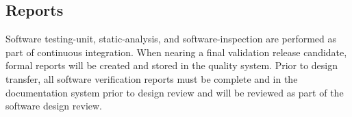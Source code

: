 \subsection{Reports}
Software \gls{testing-unit}, \gls{static-analysis}, and \gls{software-inspection}
are performed as part of continuous integration. When nearing a final validation
release candidate, formal reports will be created and stored in the quality system.
Prior to design transfer, all software verification reports must be complete and
in the documentation system prior to design review and will be reviewed as part of
the software design review.
